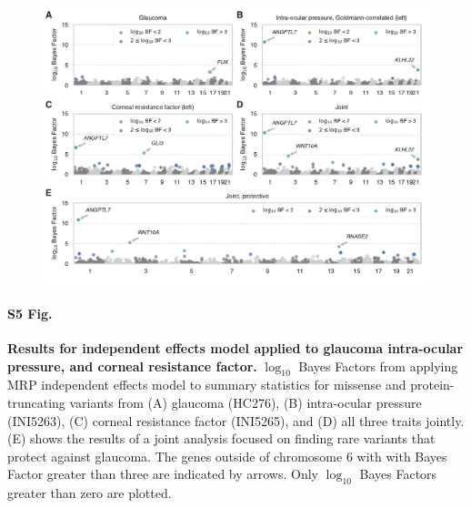 \begin{figure}[H]
\includegraphics[width=\textwidth]{../figures/Figure_S05.pdf}
\end{figure}
\paragraph*{S5 Fig.}
\label{glaucoma_independent}
{\bf Results for independent effects model applied to glaucoma intra-ocular pressure, and corneal resistance factor.} $\log_{10}$ Bayes Factors from applying MRP independent effects model to summary statistics for missense and protein-truncating variants from (A) glaucoma (HC276), (B) intra-ocular pressure (INI5263), (C) corneal resistance factor (INI5265), and (D) all three traits jointly. (E) shows the results of a joint analysis focused on finding rare variants that protect against glaucoma. The genes outside of chromosome 6 with with Bayes Factor greater than three are indicated by arrows. Only $\log_{10}$ Bayes Factors greater than zero are plotted.

